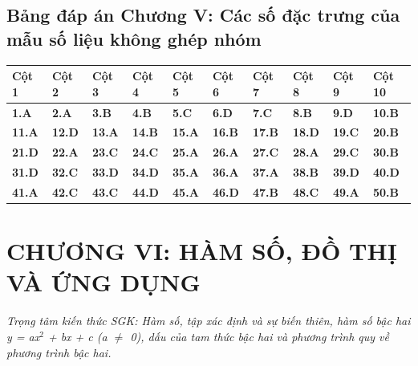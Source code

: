\documentclass[11pt,a4paper]{article}
\begin{document}
\subsection*{\color{primary} Bảng đáp án Chương V: Các số đặc trưng của mẫu số liệu không ghép nhóm}
\begin{center}
\renewcommand{\arraystretch}{1.25}
\begin{tabularx}{\textwidth}{*{10}{>{\centering\arraybackslash}X}}
\toprule
\textbf{\color{primary} Cột 1} & \textbf{\color{primary} Cột 2} & \textbf{\color{primary} Cột 3} & \textbf{\color{primary} Cột 4} & \textbf{\color{primary} Cột 5} & \textbf{\color{primary} Cột 6} & \textbf{\color{primary} Cột 7} & \textbf{\color{primary} Cột 8} & \textbf{\color{primary} Cột 9} & \textbf{\color{primary} Cột 10} \\
\midrule
\textbf{1.A} & \textbf{2.A} & \textbf{3.B} & \textbf{4.B} & \textbf{5.C} & \textbf{6.D} & \textbf{7.C} & \textbf{8.B} & \textbf{9.D} & \textbf{10.B} \\
\rowcolor{rowtint} \textbf{11.A} & \textbf{12.D} & \textbf{13.A} & \textbf{14.B} & \textbf{15.A} & \textbf{16.B} & \textbf{17.B} & \textbf{18.D} & \textbf{19.C} & \textbf{20.B} \\
\textbf{21.D} & \textbf{22.A} & \textbf{23.C} & \textbf{24.C} & \textbf{25.A} & \textbf{26.A} & \textbf{27.C} & \textbf{28.A} & \textbf{29.C} & \textbf{30.B} \\
\rowcolor{rowtint} \textbf{31.D} & \textbf{32.C} & \textbf{33.D} & \textbf{34.D} & \textbf{35.A} & \textbf{36.A} & \textbf{37.A} & \textbf{38.B} & \textbf{39.D} & \textbf{40.D} \\
\textbf{41.A} & \textbf{42.C} & \textbf{43.C} & \textbf{44.D} & \textbf{45.A} & \textbf{46.D} & \textbf{47.B} & \textbf{48.C} & \textbf{49.A} & \textbf{50.B} \\
\bottomrule
\end{tabularx}
\end{center}\vspace{10pt}
\section*{\color{primary} CHƯƠNG VI: HÀM SỐ, ĐỒ THỊ VÀ ỨNG DỤNG}
\textit{Trọng tâm kiến thức SGK: Hàm số, tập xác định và sự biến thiên, hàm số bậc hai y = ax$^2$ + bx + c (a $\ne$ 0), dấu của tam thức bậc hai và phương trình quy về phương trình bậc hai.}\par\vspace{4pt}
\end{document}
